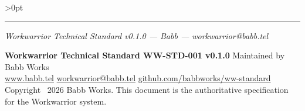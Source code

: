 \documentclass[11pt, a4paper, DIV=14]{scrartcl}
\let\origRule\rule
\renewcommand{\rule}[3][0pt]{%
  \ifnum\dimexpr#3\relax>0pt
    \par\vspace{2pt}\noindent{\color{BabbBorder}\origRule[#1]{#2}{#3}}\par\vspace{2pt}%
  \else
    \origRule[#1]{#2}{#3}%
  \fi
}
\begin{document}
\begin{center}\rule{0.5\linewidth}{0.5pt}\end{center}

\emph{Workwarrior Technical Standard v0.1.0 --- Babb ---
workwarrior@babb.tel}

\vspace{12pt}
\noindent{\color{BabbBorder}\origRule[0pt]{\linewidth}{0.5pt}}
\vspace{4pt}

{\footnotesize\sffamily\color{BabbGray}
\textbf{Workwarrior Technical Standard WW-STD-001 v0.1.0}
\enspace\textbar\enspace Maintained by Babb Works\\
\href{https://www.babb.tel}{www.babb.tel}
\enspace\textbar\enspace
\href{mailto:workwarrior@babb.tel}{workwarrior@babb.tel}
\enspace\textbar\enspace
\href{https://github.com/babbworks/ww-standard}{github.com/babbworks/ww-standard}\\[2pt]
Copyright \textcopyright~2026 Babb Works.
This document is the authoritative specification for the Workwarrior system.
}
\end{document}
